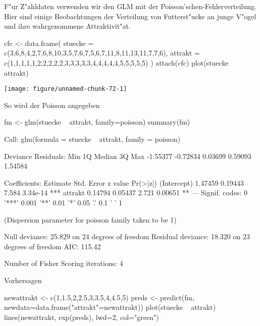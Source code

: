 \documentclass[a4paper,twoside]{tufte-book}\usepackage[]{graphicx}\usepackage[]{color}
\makeatletter
\def\maxwidth{ %
  \ifdim\Gin@nat@width>\linewidth
    \linewidth
  \else
    \Gin@nat@width
  \fi
}
\makeatother
\begin{document}
\begin{appendices}
F"ur Z"ahldaten verwenden wir den GLM mit der Poisson'schen-Fehlerverteilung. Hier sind einige Beobachtungen der Verteilung von Futterst"ucke an junge V"ogel und ihre wahrgenommene Attraktivit"at.

\begin{Schunk}
\begin{Sinput}
cfc <- data.frame(
  stuecke = c(3,6,8,4,2,7,6,8,10,3,5,7,6,7,5,6,7,11,8,11,13,11,7,7,6),
  attrakt = c(1,1,1,1,1,2,2,2,2,2,3,3,3,3,3,4,4,4,4,4,5,5,5,5,5) 
)
attach(cfc)
plot(stuecke ~ attrakt)
\end{Sinput}

\texttt{[image: figure/unnamed-chunk-72-1]} \end{Schunk}

So wird der Poisson angegeben

\begin{Schunk}
\begin{Sinput}
fm <- glm(stuecke ~ attrakt, family=poisson)
summary(fm)
\end{Sinput}
\begin{Soutput}

Call:
glm(formula = stuecke ~ attrakt, family = poisson)

Deviance Residuals: 
     Min        1Q    Median        3Q       Max  
-1.55377  -0.72834   0.03699   0.59093   1.54584  

Coefficients:
            Estimate Std. Error z value Pr(>|z|)    
(Intercept)  1.47459    0.19443   7.584 3.34e-14 ***
attrakt      0.14794    0.05437   2.721  0.00651 ** 
---
Signif. codes:  0 '***' 0.001 '**' 0.01 '*' 0.05 '.' 0.1 ' ' 1

(Dispersion parameter for poisson family taken to be 1)

    Null deviance: 25.829  on 24  degrees of freedom
Residual deviance: 18.320  on 23  degrees of freedom
AIC: 115.42

Number of Fisher Scoring iterations: 4
\end{Soutput}
\end{Schunk}

Vorhersagen

\begin{Schunk}
\begin{Sinput}
newattrakt <- c(1,1.5,2,2.5,3,3.5,4,4.5,5)
preds <- predict(fm, newdata=data.frame("attrakt"=newattrakt))
plot(stuecke ~ attrakt)
lines(newattrakt, exp(preds), lwd=2, col="green")
\end{Sinput}


\end{Schunk}
\end{appendices}
\end{document}
